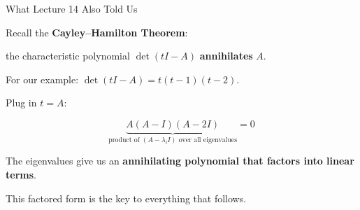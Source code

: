\documentclass[10pt]{beamer}
\theoremstyle{definition}
\newcommand{\x}[1]{\alert{\textbf{#1}}}
\begin{document}
%
%
\begin{frame}{What Lecture 14 Also Told Us}

Recall the \x{Cayley--Hamilton Theorem}:

\medskip

the characteristic polynomial $\det(tI - A)$ \x{annihilates} $A$.

\vfill

For our example: $\det(tI-A) = t(t-1)(t-2)$.

\vfill

Plug in $t = A$:

$$\underbrace{A(A - I)(A - 2I)}_{\text{product of } (A - \lambda_i I) \text{ over all eigenvalues}} = 0$$

\vfill\pause

The eigenvalues give us an \x{annihilating polynomial that factors into linear terms}.

\vfill

This factored form is the key to everything that follows.

\end{frame}
\end{document}
